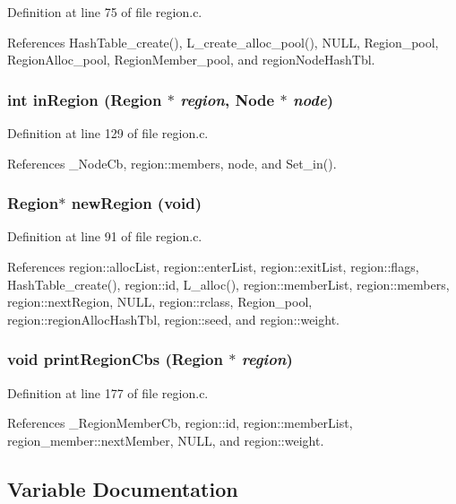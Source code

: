 Definition at line 75 of file region.c.

References Hash\-Table\_\-create(), L\_\-create\_\-alloc\_\-pool(), NULL, Region\_\-pool, Region\-Alloc\_\-pool, Region\-Member\_\-pool, and region\-Node\-Hash\-Tbl.
\subsubsection{\setlength{\rightskip}{0pt plus 5cm}int in\-Region (\bf{Region} $\ast$ {\em region}, \bf{Node} $\ast$ {\em node})}\label{region_8c_34d3995284a72df5bda745011f4c5430}




Definition at line 129 of file region.c.

References \_\-Node\-Cb, region::members, node, and Set\_\-in().
\subsubsection{\setlength{\rightskip}{0pt plus 5cm}\bf{Region}$\ast$ new\-Region (void)}\label{region_8c_01dacc4f40c21699910354b785fb3d09}




Definition at line 91 of file region.c.

References region::alloc\-List, region::enter\-List, region::exit\-List, region::flags, Hash\-Table\_\-create(), region::id, L\_\-alloc(), region::member\-List, region::members, region::next\-Region, NULL, region::rclass, Region\_\-pool, region::region\-Alloc\-Hash\-Tbl, region::seed, and region::weight.
\subsubsection{\setlength{\rightskip}{0pt plus 5cm}void print\-Region\-Cbs (\bf{Region} $\ast$ {\em region})}\label{region_8c_3af735e504b98da478c1293487bccc9d}




Definition at line 177 of file region.c.

References \_\-Region\-Member\-Cb, region::id, region::member\-List, region\_\-member::next\-Member, NULL, and region::weight.

\subsection{Variable Documentation}
